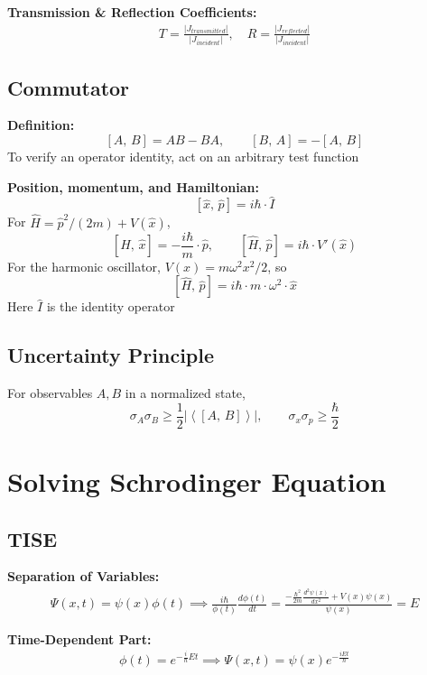 \documentclass[12pt]{article}
\begin{document}
\textbf{Transmission \& Reflection Coefficients: }
\begin{align}
    T = \frac{|J_{transmitted}|}{|J_{incident}|}, \quad R = \frac{|J_{reflected}|}{|J_{incident}|} 
\end{align} 

\subsection{Commutator}

\textbf{Definition:}
\[
    \left[A,\,B\right]=AB-BA,\qquad \left[B,\,A\right]=-\left[A,\,B\right]
\]
To verify an operator identity, act on an arbitrary test function

\textbf{Position, momentum, and Hamiltonian:}
\[
    \left[\hat x,\,\hat p\right]=i\hbar\cdot\hat I
\]
For $\hat H=\hat p^2/(2m)+V(\hat x)$,
\[
    \left[\hat H,\,\hat x\right]=-\frac{i\hbar}{m}\cdot\hat p,
    \qquad \left[\hat H,\,\hat p\right]=i\hbar\cdot V'(\hat x)
\]
For the harmonic oscillator, $V(x)=m\omega^2x^2/2$, so
\[
    \left[\hat H,\,\hat p\right]=i\hbar\cdot m\cdot\omega^2\cdot\hat x
\]
Here $\hat I$ is the identity operator

\subsection{Uncertainty Principle}

For observables $A,B$ in a normalized state,
\[
    \sigma_A\sigma_B\geq\frac12\left|\left\langle\left[A,\,B\right]\right\rangle\right|,
    \qquad \sigma_x\sigma_p\geq\frac{\hbar}{2}
\]

\section{Solving Schrodinger Equation } 

\subsection{TISE } 

\textbf{Separation of Variables: } 
\begin{align}
    \Psi(x,t) = \psi(x) \phi(t) \implies \frac{i\hbar}{\phi(t)} \frac{d\phi(t)}{dt} = \frac{-\frac{\hbar^2}{2m} \frac{d^2 \psi(x)}{dx^2} + V(x) \psi(x)}{\psi(x)} = E 
\end{align} 

\textbf{Time-Dependent Part: } 
\begin{align}
    \phi(t) = e^{-\frac{i}{\hbar} Et} \implies \Psi(x,t) = \psi(x) e^{-\frac{iEt}{\hbar} } 
\end{align} 
\end{document}
